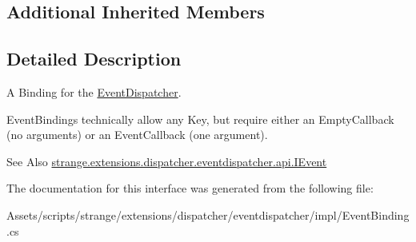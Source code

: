\subsection*{Additional Inherited Members}


\subsection{Detailed Description}
A Binding for the \hyperlink{classstrange_1_1extensions_1_1dispatcher_1_1eventdispatcher_1_1impl_1_1_event_dispatcher}{Event\-Dispatcher}. 

Event\-Bindings technically allow any Key, but require either an Empty\-Callback (no arguments) or an Event\-Callback (one argument).

\begin{DoxySeeAlso}{See Also}
\hyperlink{interfacestrange_1_1extensions_1_1dispatcher_1_1eventdispatcher_1_1api_1_1_i_event}{strange.\-extensions.\-dispatcher.\-eventdispatcher.\-api.\-I\-Event} 
\end{DoxySeeAlso}


The documentation for this interface was generated from the following file\-:\begin{DoxyCompactItemize}
\item 
Assets/scripts/strange/extensions/dispatcher/eventdispatcher/impl/Event\-Binding.\-cs\end{DoxyCompactItemize}
